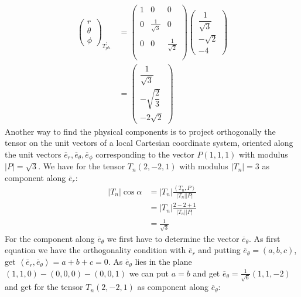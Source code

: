 \begin{align}
\begin{pmatrix}
r\\
\theta\\
\phi
\end{pmatrix}_{T^{'}_{ph.}}&=\begin{pmatrix}
1&0&0\\\\
0&\frac{1}{\sqrt{3}}&0\\\\
0&0&\frac{1}{\sqrt{2}}\\\\
\end{pmatrix}\begin{pmatrix}
\dfrac {1}{\sqrt{3}}\\
-\sqrt{2}\\
-4
\end{pmatrix}\\
&=\begin{pmatrix}
\dfrac {1}{\sqrt{3}}\\
-\sqrt{\dfrac {{2}}{{3}}}\\
-2\sqrt{2}
\end{pmatrix}
\end{align}
Another way to find the physical components is to project orthogonally the tensor on the unit vectors of a local Cartesian coordinate system, oriented along the unit vectors $\overline{e}_r,\overline{e}_{\theta},\overline{e}_{\phi}$ corresponding to the vector $P \left(1,1,1\right)$ with modulus $\left|P \right|=\sqrt{3}$. 
We have for the tensor $T_n (2,-2,1)$ with modulus $\left|T_n \right|=3$ as component along $\overline{e}_r$:
\begin{align}
\left|T_n \right|\cos \alpha &= \left|T_n \right|\frac{\left<T_n,P  \right>}{\left|T_n \right|\left|P \right|}\\
&= \left|T_n \right|\frac{2-2+1}{\left|T_n \right|\left|P \right|}\\
&= \frac{1}{\sqrt{3}}
\end{align}
For the component along $\overline{e}_{\theta}$ we first have to determine the vector $\overline{e}_{\theta}$. As first equation we have the orthogonality condition with $\overline{e}_r$ and putting $\overline{e}_{\theta} = (a,b,c)$, get $\left<\overline{e}_r,\overline{e}_{\theta}  \right>=  a+b+c=0$. As $\overline{e}_{\theta}$ lies in the plane $(1,1,0)-(0,0,0)-(0,0,1)$ we can put $a=b$ and get $\overline{e}_{\theta} =  \frac{1}{\sqrt{6}}\left(1,1,-2\right)$ and get for the tensor $T_n (2,-2,1)$  as component along $\overline{e}_{\theta}$:
